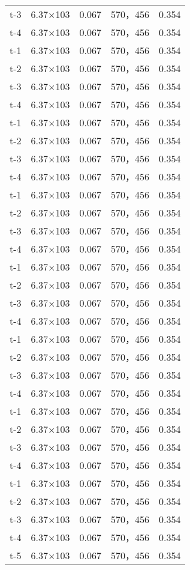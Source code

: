 \documentclass[../../main.tex]{subfiles}
\begin{document}
\begin{longtable}{ccccc}
t-3     &6.37×103       &0.067  &570，456        &0.354\\
t-4     &6.37×103       &0.067  &570，456        &0.354\\
t-1     &6.37×103       &0.067  &570，456        &0.354\\
t-2     &6.37×103       &0.067  &570，456        &0.354\\
t-3     &6.37×103       &0.067  &570，456        &0.354\\
t-4     &6.37×103       &0.067  &570，456        &0.354\\
t-1     &6.37×103       &0.067  &570，456        &0.354\\
t-2     &6.37×103       &0.067  &570，456        &0.354\\
t-3     &6.37×103       &0.067  &570，456        &0.354\\
t-4     &6.37×103       &0.067  &570，456        &0.354\\
t-1     &6.37×103       &0.067  &570，456        &0.354\\
t-2     &6.37×103       &0.067  &570，456        &0.354\\
t-3     &6.37×103       &0.067  &570，456        &0.354\\
t-4     &6.37×103       &0.067  &570，456        &0.354\\
t-1     &6.37×103       &0.067  &570，456        &0.354\\
t-2     &6.37×103       &0.067  &570，456        &0.354\\
t-3     &6.37×103       &0.067  &570，456        &0.354\\
t-4     &6.37×103       &0.067  &570，456        &0.354\\
t-1     &6.37×103       &0.067  &570，456        &0.354\\
t-2     &6.37×103       &0.067  &570，456        &0.354\\
t-3     &6.37×103       &0.067  &570，456        &0.354\\
t-4     &6.37×103       &0.067  &570，456        &0.354\\
t-1     &6.37×103       &0.067  &570，456        &0.354\\
t-2     &6.37×103       &0.067  &570，456        &0.354\\
t-3     &6.37×103       &0.067  &570，456        &0.354\\
t-4     &6.37×103       &0.067  &570，456        &0.354\\
t-1     &6.37×103       &0.067  &570，456        &0.354\\
t-2     &6.37×103       &0.067  &570，456        &0.354\\
t-3     &6.37×103       &0.067  &570，456        &0.354\\
t-4     &6.37×103       &0.067  &570，456        &0.354\\
t-5     &6.37×103       &0.067  &570，456        &0.354\\ \hline
\end{longtable}
\end{document}

